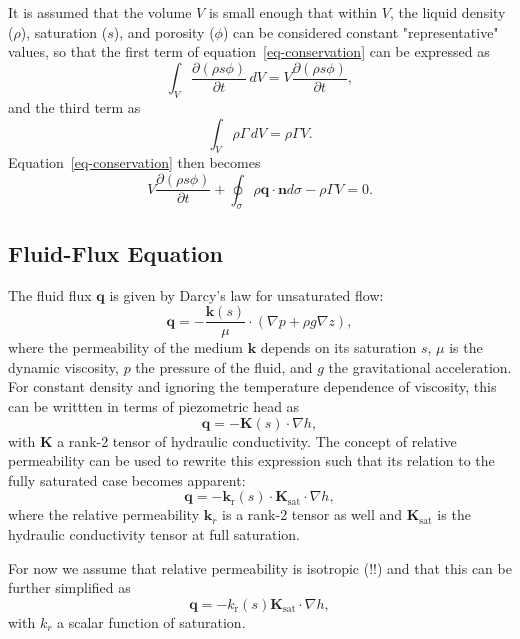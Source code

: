 \documentclass[fleqn]{article}
\begin{document}
It is assumed that the volume $V$ is small enough that within $V$, the
liquid density ($\rho$), saturation ($s$), and porosity ($\phi$) can be
considered constant "representative" values, so that the first term of
equation~\ref{eq-conservation} can be expressed as
\begin{equation}
  \int_V \frac{\partial (\rho s \phi)}{\partial t} \,dV = 
  V \frac{\partial (\rho s \phi)}{\partial t},
\end{equation}
and the third term as
\begin{equation}
  \int_V \rho \Gamma \,dV = \rho \Gamma V.
\end{equation}
Equation~\ref{eq-conservation} then becomes
\begin{equation}
  V \frac{\partial (\rho s \phi)}{\partial t} +
  \oint_\sigma \rho \mathbf{q} \cdot \mathbf{n} d\sigma -
  \rho \Gamma V = 0.
\end{equation}

\subsection{Fluid-Flux Equation}
The fluid flux $\mathbf{q}$ is given by Darcy's law for unsaturated flow:
\begin{equation}
  \mathbf{q} = - \frac{\mathbf{k}(s)}{\mu} \cdot ( \nabla p + \rho g \nabla z ),
\end{equation}
where the permeability of the medium $\mathbf{k}$ depends on its saturation $s$,
$\mu$ is the dynamic viscosity, $p$ the pressure of the fluid, and $g$ the
gravitational acceleration. For constant density and ignoring the temperature
dependence of viscosity, this can be writtten in terms of piezometric head as
\begin{equation}
  \mathbf{q} = - \mathbf{K}(s) \cdot \nabla h,
\end{equation}
with $\mathbf{K}$ a rank-2 tensor of hydraulic conductivity. The concept of relative
permeability can be used to rewrite this expression such that its relation
to the fully saturated case becomes apparent:
\begin{equation}
  \mathbf{q} = - \mathbf{k}_\text{r}(s) \cdot
  \mathbf{K}_{\textrm{sat}} \cdot \nabla h,
\end{equation}
where the relative permeability $\mathbf{k}_r$ is a rank-2 tensor as well and
$\mathbf{K}_\text{sat}$ is the hydraulic conductivity tensor at full saturation.

For now we assume that relative permeability is isotropic (!!) and that this 
can be further simplified as
\begin{equation}
  \mathbf{q} = - k_\text{r}(s) \mathbf{K}_{\textrm{sat}} \cdot \nabla h,
\end{equation}
with $k_r$ a scalar function of saturation.
\end{document}
